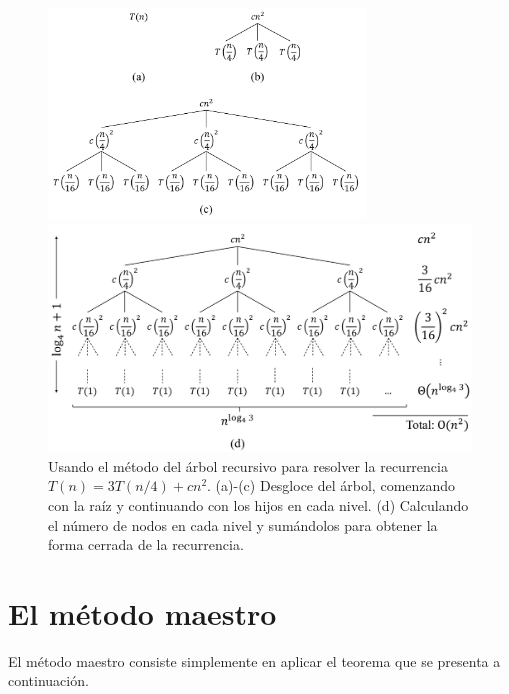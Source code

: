 \begin{figure}[H]
\begin{centering}
    \includegraphics[width=0.75\textwidth]{figuras/recursion-tree1}
    \par\end{centering}
    \begin{centering}
    \includegraphics[width=1\textwidth]{figuras/recursion-tree2}
    \par\end{centering}
    \caption{{\small{}\label{recursion-tree}Usando el método del árbol recursivo para
    resolver la recurrencia $T(n)=3T(n/4)+cn^{2}$. (a)-(c) Desgloce
    del árbol, comenzando con la raíz y continuando con los hijos en cada nivel. 
    (d) Calculando el número de nodos en cada nivel y sumándolos para obtener la
    forma cerrada de la recurrencia.}}
\end{figure}

\section{El método maestro}

El método maestro consiste simplemente en aplicar el teorema que se presenta a
continuación.

